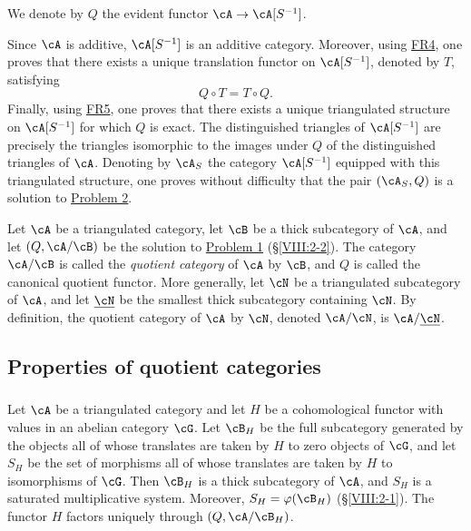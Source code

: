 \documentclass[oneside]{book}
\begin{document}
We denote by $Q$ the evident functor $\cA\to \cA[S^{-1}]$.

Since $\cA$ is additive, $\cA[S^{-1}]$ is an additive category. Moreover,
using \hyperlink{VIII:FR4}{FR4}, one proves that there exists a unique
translation functor on $\cA[S^{-1}]$, denoted by $T$, satisfying
\[
  Q\circ T = T\circ Q \text{.}
\]
Finally, using \hyperlink{VIII:FR5}{FR5}, one proves that there exists a
unique triangulated structure on $\cA[S^{-1}]$ for which $Q$ is exact.
The distinguished triangles of $\cA[S^{-1}]$ are precisely the triangles
isomorphic to the images under $Q$ of the distinguished triangles of
$\cA$. Denoting by $\cA_S$ the category $\cA[S^{-1}]$ equipped with this
triangulated structure, one proves without difficulty that the pair
$(\cA_S,Q)$ is a solution to \hyperlink{VIII:prob2}{Problem 2}.

\begin{definition}\label{VIII:2-3-3}
Let $\cA$ be a triangulated category, let $\cB$ be a thick subcategory of
$\cA$, and let $(Q,\cA/\cB)$ be the solution to
\hyperlink{VIII:prob1}{Problem 1} (\S \ref{VIII:2-2}). The category
$\cA/\cB$ is called the \emph{quotient category} of $\cA$ by $\cB$, and
$Q$ is called the canonical quotient functor. More generally, let $\cN$
be a triangulated subcategory of $\cA$, and let $\underline\cN$ be the
smallest thick subcategory containing $\cN$. By definition, the quotient
category of $\cA$ by $\cN$, denoted $\cA/\cN$, is
$\cA/\underline\cN$.
\end{definition}

\subsection{Properties of quotient categories}\label{VIII:2-4}

\subsubsection{}\label{VIII:2-4-1}

Let $\cA$ be a triangulated category and let $H$ be a cohomological functor
with values in an abelian category $\cG$. Let $\cB_H$ be the full
subcategory generated by the objects all of whose translates are taken by
$H$ to zero objects of $\cG$, and let $S_H$ be the set of morphisms all of
whose translates are taken by $H$ to isomorphisms of $\cG$. Then $\cB_H$
is a thick subcategory of $\cA$, and $S_H$ is a saturated multiplicative
system. Moreover, $S_H=\varphi(\cB_H)$ (\S \ref{VIII:2-1}). The functor
$H$ factors uniquely through $(Q,\cA/\cB_H)$.
\end{document}
